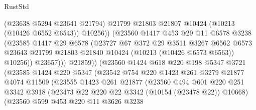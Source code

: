\begin{lexlean}{RustStd}
\begin{coremodule}
                              (@23638 @5294 @23641 @21794)
                              @21799
                              @21803
                              @21807
                              @10424
                              (@10213 (@10426 @6552 @6543))
                              @10256))
                          (@23560
                            @1417
                            @453
                            @29
                            @11
                            @6578
                            @3238
                            (@23585
                              @1417
                              @29
                              @6578
                              (@23727
                                @67
                                @372
                                @29
                                @3511
                                @3267
                                @6562
                                @6573
                                @23643
                                @21799
                                @21803
                                @21840
                                @10424
                                (@10213 (@10426 @6573 @6563))
                                @10256))
                            @23657)))
                      @21859))
                  (@23560
                    @1424
                    @618
                    @220
                    @198
                    @5347
                    @3721
                    (@23585
                      @1424
                      @220
                      @5347
                      (@23542
                        @754
                        @220
                        @1423
                        @261
                        @3279
                        @21877
                        @4074
                        @11509
                        (@23555
                          @1423
                          @261
                          @21877
                          (@23560
                            @494
                            @601
                            @220
                            @251
                            @3342
                            @3918
                            (@23473 @22 @220 @22 @3342 (@10154 (@23478 @22)) @10668)
                            (@23560
                              @599
                              @453
                              @220
                              @11
                              @3626
                              @3238

\end{coremodule}
\end{lexlean}
